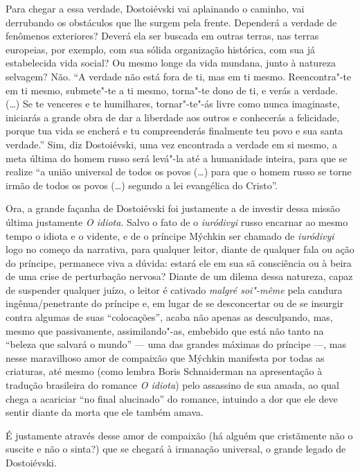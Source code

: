 Para chegar a essa verdade, Dostoiévski vai aplainando o caminho,
vai derrubando os obstáculos que lhe surgem pela frente. Dependerá
a verdade de fenômenos exteriores? Deverá ela ser buscada em
outras terras, nas terras europeias, por exemplo, com sua
sólida organização histórica, com sua já estabelecida vida
social? Ou mesmo longe da vida mundana, junto à natureza
selvagem? Não. ``A verdade não está fora de ti, mas em ti
mesmo. Reencontra"-te em ti mesmo, submete"-te a ti mesmo,
torna"-te dono de ti, e verás a verdade. (\ldots{}) Se te
venceres e te humilhares, tornar"-te"-ás livre como nunca
imaginaste, iniciarás a grande obra de dar a liberdade aos
outros e conhecerás a felicidade, porque tua vida se
encherá e tu compreenderás finalmente teu povo e sua santa
verdade.'' Sim, diz Dostoiévski, uma vez encontrada a verdade
em si mesmo, a meta última do homem russo será levá"-la até a
humanidade inteira, para que se realize ``a união universal de
todos os povos (\ldots{}) para que o homem
russo se torne irmão de todos os povos (\ldots{}) segundo a lei
evangélica do Cristo''.

Ora, a grande façanha de Dostoiévski foi justamente a de investir
dessa missão última justamente \emph{O idiota}. Salvo o fato de
o \emph{iuródivyi} russo encarnar ao mesmo tempo o idiota e o
vidente, e de o príncipe Mýchkin ser chamado de \emph{iuródivyi}
logo no começo da narrativa, para qualquer leitor, diante de
qualquer fala ou ação do príncipe, permanece viva a dúvida:
estará ele em sua sã consciência ou à beira de uma crise de
perturbação nervosa? Diante de um dilema dessa natureza, capaz
de suspender qualquer juízo, o leitor é cativado \emph{malgré
soi"-même} pela candura ingênua/penetrante do príncipe e, em
lugar de se desconcertar ou de se insurgir contra algumas de
suas ``colocações'', acaba não apenas as desculpando, mas,
mesmo que passivamente, assimilando"-as, embebido que está não
tanto na ``beleza que salvará o mundo'' --- uma das grandes
máximas do príncipe ---, mas nesse maravilhoso amor de
compaixão que Mýchkin manifesta por todas as criaturas, até
mesmo (como lembra Boris Schnaiderman na apresentação à
tradução brasileira do romance \emph{O idiota}) pelo
assassino de sua amada, ao qual chega a acariciar ``no final
alucinado'' do romance, intuindo a dor que ele deve sentir
diante da morta que ele também amava.

É justamente através desse amor de compaixão (há alguém que cristãmente não o suscite e não o sinta?) que se chegará à irmanação universal, o grande legado de Dostoiévski.

